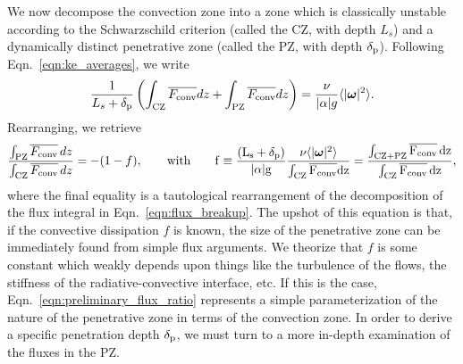 \documentclass{aastex631}
\newcommand{\delp}{\ensuremath{\delta_{\rm{p}}}}
\newcommand{\Fconv}{\ensuremath{F_{\rm{conv}}}}
\newcommand{\angles}[1]{\langle #1 \rangle}
\renewcommand{\vec}[1]{\boldsymbol{#1}}
\renewcommand{\bar}[1]{\overline{#1}}
\begin{document}
We now decompose the convection zone into a zone which is classically unstable according to the Schwarzschild criterion (called the CZ, with depth $L_s$) and a dynamically distinct penetrative zone (called the PZ, with depth $\delp$).
Following Eqn.~\ref{eqn:ke_averages}, we write
\begin{equation}
\frac{1}{L_s + \delp}\left(\int_{\rm{CZ}} \bar{\Fconv} dz + \int_{\rm{PZ}} \bar{\Fconv} dz \right) = \frac{\nu}{|\alpha| g} \angles{|\vec{\omega}|^2}.
\label{eqn:flux_breakup}
\end{equation}
Rearranging, we retrieve 
\begin{equation}
\frac{\int_{\rm{PZ}}\bar{\Fconv}\,dz}{\int_{\rm{CZ}}\bar{\Fconv}\,dz} = -(1 - f),
\qquad\rm{with}\qquad
f \equiv \frac{(L_s + \delp)}{|\alpha| g} \frac{\nu\angles{|\vec{\omega}|^2}}{\int_{\rm{CZ}} \bar{\Fconv} dz}
= \frac{\int_{\rm{CZ+PZ}}\bar{\Fconv}\,dz}{\int_{\rm{CZ}}\bar{\Fconv}\,dz},
\label{eqn:preliminary_flux_ratio}
\end{equation}
where the final equality is a tautological rearrangement of the decomposition of the flux integral in Eqn.~\ref{eqn:flux_breakup}.
The upshot of this equation is that, if the convective dissipation $f$ is known, the size of the penetrative zone can be immediately found from simple flux arguments.
We theorize that $f$ is some constant which weakly depends upon things like the turbulence of the flows, the stiffness of the radiative-convective interface, etc.
If this is the case, Eqn.~\ref{eqn:preliminary_flux_ratio} represents a simple parameterization of the nature of the penetrative zone in terms of the convection zone.
In order to derive a specific penetration depth $\delp$, we must turn to a more in-depth examination of the fluxes in the PZ.
\end{document}
